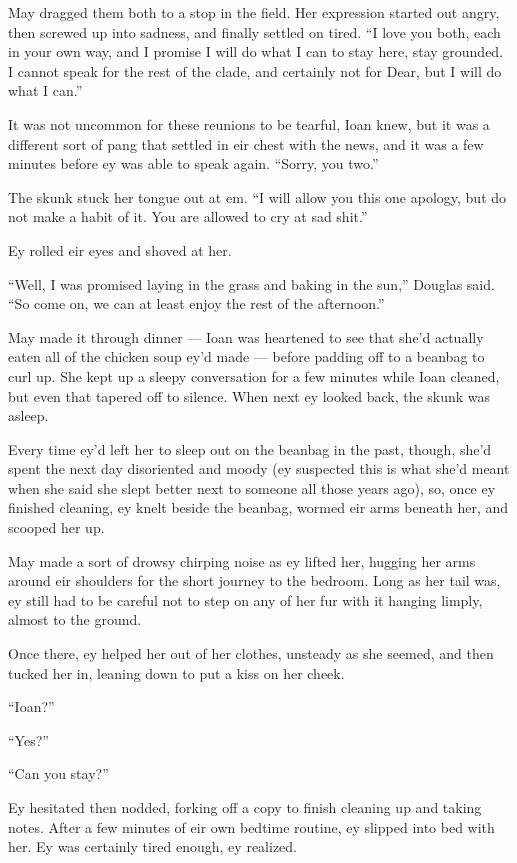 May dragged them both to a stop in the field. Her expression started out angry, then screwed up into sadness, and finally settled on tired. ``I love you both, each in your own way, and I promise I will do what I can to stay here, stay grounded. I cannot speak for the rest of the clade, and certainly not for Dear, but I will do what I can.''

It was not uncommon for these reunions to be tearful, Ioan knew, but it was a different sort of pang that settled in eir chest with the news, and it was a few minutes before ey was able to speak again. ``Sorry, you two.''

The skunk stuck her tongue out at em. ``I will allow you this one apology, but do not make a habit of it. You are allowed to cry at sad shit.''

Ey rolled eir eyes and shoved at her.

``Well, I was promised laying in the grass and baking in the sun,'' Douglas said. ``So come on, we can at least enjoy the rest of the afternoon.''

May made it through dinner — Ioan was heartened to see that she'd actually eaten all of the chicken soup ey'd made — before padding off to a beanbag to curl up. She kept up a sleepy conversation for a few minutes while Ioan cleaned, but even that tapered off to silence. When next ey looked back, the skunk was asleep.

Every time ey'd left her to sleep out on the beanbag in the past, though, she'd spent the next day disoriented and moody (ey suspected this is what she'd meant when she said she slept better next to someone all those years ago), so, once ey finished cleaning, ey knelt beside the beanbag, wormed eir arms beneath her, and scooped her up.

May made a sort of drowsy chirping noise as ey lifted her, hugging her arms around eir shoulders for the short journey to the bedroom. Long as her tail was, ey still had to be careful not to step on any of her fur with it hanging limply, almost to the ground.

Once there, ey helped her out of her clothes, unsteady as she seemed, and then tucked her in, leaning down to put a kiss on her cheek.

``Ioan?''

``Yes?''

``Can you stay?''

Ey hesitated then nodded, forking off a copy to finish cleaning up and taking notes. After a few minutes of eir own bedtime routine, ey slipped into bed with her. Ey was certainly tired enough, ey realized.

